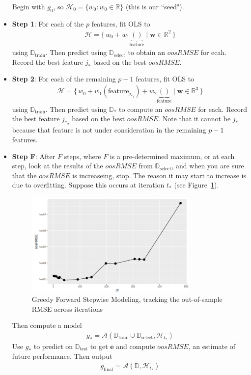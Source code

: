 \documentclass[12pt, a4paper]{article}
\theoremstyle{definition}
\newcommand{\test}{\text{test}}
\newcommand{\train}{\text{train}}
\newcommand{\select}{\text{select}}
\newcommand{\Dtest}{\mathbb{D}_{\test}}
\newcommand{\Dtrain}{\mathbb{D}_{\train}}
\newcommand{\Dselect}{\mathbb{D}_{\select}}
\begin{document}
\begin{itemize}
		Begin with $g_0$, so $\mathcal{H}_0=\{w_0:w_0\in \mathbb{R}\}$ (this is our ``seed").
		\item \textbf{Step 1}: For each of the $p$ features, fit OLS to
		\begin{align*}
			\mathcal{H} = \{\,
			w_0+w_1\underbrace{()}_{\text{feature}}\mid \bm{w}\in\mathbb{R}^2
			\,\}
		\end{align*}
		using $\Dtrain$. Then predict using $\Dselect$ to obtain an $oosRMSE$ for ecah.
		Record the best feature $j_*$ based on the best $oosRMSE$.
		\item \textbf{Step 2}: For each of the remaining $p-1$ features, fit OLS to
		\begin{align*}
			\mathcal{H} = \{\,
			w_0 + w_1(\text{feature}_{j_{*_1}}) + w_2\underbrace{()}_{\text{feature}} \mid
			\bm{w}\in\mathbb{R}^3
			\,\}
		\end{align*}
		using $\Dtrain$. Then predict using $\mathbb{D}_*$ to compute an $oosRMSE$ for
		each. Record the best feature $j_{*_2}$ based on the best $oosRMSE$.
		Note that it cannot be $j_{*_1}$ because that feature is not under consideration
		in the remaining $p-1$ features.
		\item \textbf{Step F}: After $F$ steps, where $F$ is a pre-determined maximum, or
		at each step, look at the results of the $oosRMSE$ from $\Dselect$, and when you
		are sure that the $oosRMSE$ is increaseing, stop. The reason it may start to
		increase is due to overfitting. Suppose this occurs at iteration $t_*$
		(see Figure~\ref{fig:greedy-stepwise-oosRMSE}).
		\begin{figure}
			\centering
			\includegraphics[width=0.8\textwidth]{greedy-forward-stepwise-oosRMSE-by-iteration}
			\caption{Greedy Forward Stepwise Modeling, tracking the out-of-sample RMSE
			across iterations}
			\label{fig:greedy-stepwise-oosRMSE}
		\end{figure}
		Then compute a model
		\begin{align*}
			g_* = \mathcal{A}(\Dtrain \cup \Dselect, \mathcal{H}_{t_*})
		\end{align*}
		Use $g_*$ to predict on $\Dtest$ to get $\bm{e}$ and compute $oosRMSE$, an
		estimate of future performance. Then output
		\begin{align*}
			g_{\text{final}} = \mathcal{A}(\mathbb{D}, \mathcal{H}_{t_*})
		\end{align*}
	\end{itemize}
\end{document}
